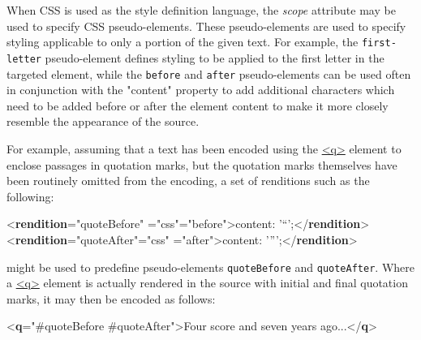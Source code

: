 When CSS is used as the style definition language, the {\itshape scope} attribute may be used to specify CSS pseudo-elements. These pseudo-elements are used to specify styling applicable to only a portion of the given text. For example, the \texttt{first-letter} pseudo-element defines styling to be applied to the first letter in the targeted element, while the \texttt{before} and \texttt{after} pseudo-elements can be used often in conjunction with the "content" property to add additional characters which need to be added before or after the element content to make it more closely resemble the appearance of the source.\par
For example, assuming that a text has been encoded using the \hyperref[TEI.q]{<q>} element to enclose passages in quotation marks, but the quotation marks themselves have been routinely omitted from the encoding, a set of renditions such as the following: \par\bgroup{}\exampleFont \begin{shaded}\noindent\mbox{}{<\textbf{rendition}\hspace*{1em}{xml:id}="{quoteBefore}"\mbox{}\newline 
\hspace*{1em}{scheme}="{css}"\hspace*{1em}{scope}="{before}">}content:\mbox{}\newline 
 '“';{</\textbf{rendition}>}\mbox{}\newline 
{<\textbf{rendition}\hspace*{1em}{xml:id}="{quoteAfter}"\hspace*{1em}{scheme}="{css}"\mbox{}\newline 
\hspace*{1em}{scope}="{after}">}content:\mbox{}\newline 
 '”';{</\textbf{rendition}>}\end{shaded}\egroup\par \noindent  might be used to predefine pseudo-elements \texttt{quoteBefore} and \texttt{quoteAfter}. Where a \hyperref[TEI.q]{<q>} element is actually rendered in the source with initial and final quotation marks, it may then be encoded as follows: \par\bgroup{}\exampleFont \begin{shaded}\noindent\mbox{}{<\textbf{q}\hspace*{1em}{rendition}="{\#quoteBefore \#quoteAfter}">}Four score and seven years\mbox{}\newline 
 ago...{</\textbf{q}>}\end{shaded}\egroup\par 
